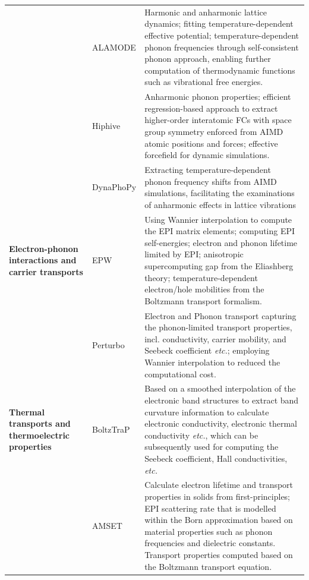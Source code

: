 \begin{longtable}{p{3cm}p{3cm}p{11cm}}
& \footnotesize{ALAMODE\cite{phono3py-pssb-2015,tadano2015self}} 
& \footnotesize{Harmonic and anharmonic lattice dynamics; fitting temperature-dependent effective potential; temperature-dependent phonon frequencies through self-consistent phonon approach, enabling further computation of thermodynamic functions such as vibrational free energies.} \\

& \footnotesize{Hiphive\cite{eriksson2019hiphive}} 
& \footnotesize{Anharmonic phonon properties; efficient regression-based approach to extract higher-order interatomic FCs with space group symmetry enforced from AIMD atomic positions and forces; effective forcefield for dynamic simulations.}\\


& 
\footnotesize{DynaPhoPy\cite{carreras2017dynaphopy}}
&\footnotesize{Extracting temperature-dependent phonon frequency shifts from AIMD simulations, facilitating the examinations of anharmonic effects in lattice vibrations}\\



\footnotesize{\textbf{Electron-phonon interactions and carrier transports}}
& \footnotesize{EPW\cite{noffsinger2010epw,ponce2016epw}} 
& \footnotesize{Using Wannier interpolation to compute the EPI matrix elements; computing EPI self-energies; electron and phonon lifetime limited by EPI; anisotropic supercomputing gap from the Eliashberg theory; temperature-dependent electron/hole mobilities from the Boltzmann transport formalism.}\\


& \footnotesize{Perturbo\cite{zhou2021perturbo}}
& \footnotesize{Electron and Phonon transport capturing the phonon-limited transport properties, incl. conductivity, carrier mobility, and Seebeck coefficient \emph{etc.}; employing Wannier interpolation to reduced the computational cost.}\\


\footnotesize{\textbf{Thermal transports and thermoelectric properties}}
&  \footnotesize{BoltzTraP\cite{madsen2006boltztrap,madsen2018boltztrap2}}
& \footnotesize{Based on a smoothed interpolation of the electronic band structures to extract band curvature information to calculate electronic conductivity, electronic thermal conductivity \emph{etc.}, which can be subsequently used for computing the Seebeck coefficient, Hall conductivities, \emph{etc.}}\\

& 
\footnotesize{AMSET\cite{Ganose2021_AMSET}}
&\footnotesize{Calculate electron lifetime and transport properties in solids from first-principles; EPI scattering rate that is modelled within the Born approximation based on material properties such as phonon frequencies and dielectric constants. Transport properties computed based on the Boltzmann transport equation.}\\


\end{longtable}
